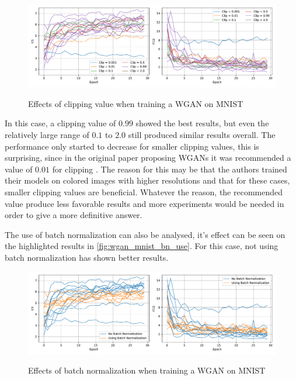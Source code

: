 \begin{figure}[hbt]
    \centering
    \caption{Effects of clipping value when training a WGAN on MNIST}
    \includegraphics[width=\textwidth]{chapters/Experiments/WGAN/mnist_clipping.pdf}
    \label{fig:wgan_mnist_clip}
\end{figure}

In this case, a clipping value of $0.99$ showed the best results, but even the relatively large range of $0.1$ to $2.0$ still produced similar results overall. The performance only started to decrease for smaller clipping values, this is surprising, since in the original paper proposing \acp{WGAN} it was recommended a value of $0.01$ for clipping \cite{wasserstein2017}. The reason for this may be that the authors trained their models on colored images with higher resolutions and that for these cases, smaller clipping values are beneficial. Whatever the reason, the recommended value produce less favorable results and more experiments would be needed in order to give a more definitive answer.

The use of batch normalization can also be analysed, it's effect can be seen on the highlighted results in \autoref{fig:wgan_mnist_bn_use}. For this case, not using batch normalization has shown better results. 
\begin{figure}[hbt]
    \centering
    \caption{Effects of batch normalization when training a WGAN on MNIST}
    \includegraphics[width=\textwidth]{chapters/Experiments/WGAN/mnist_bn_use.pdf}
    \label{fig:wgan_mnist_bn_use}
\end{figure}

